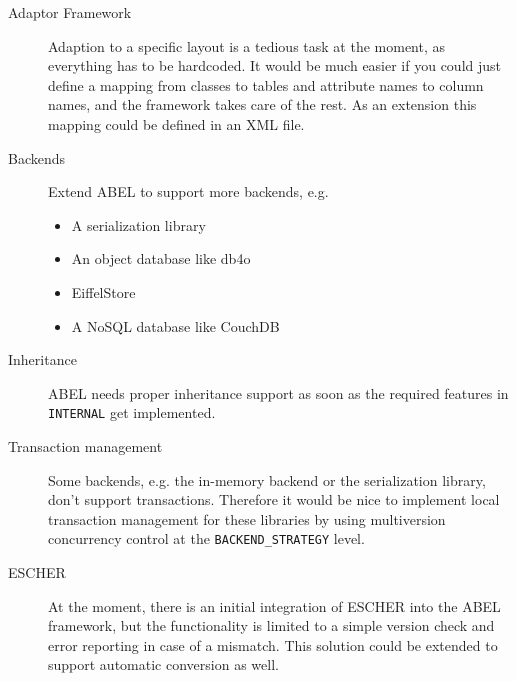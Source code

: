 \begin{description}
 \item [Adaptor Framework] Adaption to a specific layout is a tedious task at the moment, as everything has to be hardcoded. 
It would be much easier if you could just define a mapping from classes to tables and attribute names to column names, and the framework takes care of the rest.
As an extension this mapping could be defined in an XML file.
\item [Backends] Extend ABEL to support more backends, e.g.
\begin{itemize}
 \item A serialization library
 \item An object database like db4o
 \item EiffelStore
 \item A NoSQL database like CouchDB
\end{itemize}
 \item [Inheritance] ABEL needs proper inheritance support as soon as the required features in \lstinline!INTERNAL! get implemented.
\item [Transaction management] Some backends, e.g. the in-memory backend or the serialization library, don't support transactions.
 Therefore it would be nice to implement local transaction management for these libraries by using multiversion concurrency control at the \lstinline!BACKEND_STRATEGY! level.
\item [ESCHER] At the moment, there is an initial integration of ESCHER into the ABEL framework, but the functionality is limited to a simple version check and error reporting in case of a mismatch.
 This solution could be extended to support automatic conversion as well.
\end{description}
